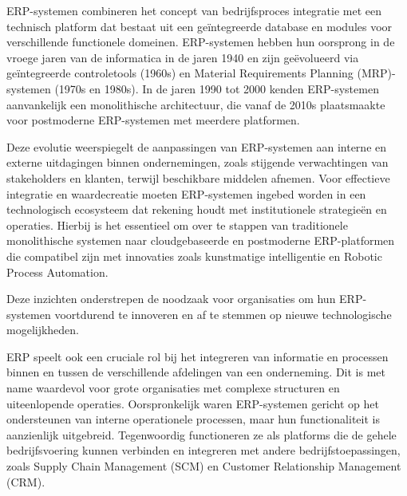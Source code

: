 ERP-systemen combineren het concept van bedrijfsproces integratie met een technisch platform dat bestaat uit een geïntegreerde database en modules voor verschillende functionele domeinen. ERP-systemen hebben hun oorsprong in de vroege jaren van de informatica in de jaren 1940 en zijn geëvolueerd via geïntegreerde controletools (1960s) en Material Requirements Planning (MRP)-systemen (1970s en 1980s). In de jaren 1990 tot 2000 kenden ERP-systemen aanvankelijk een monolithische architectuur, die vanaf de 2010s plaatsmaakte voor postmoderne ERP-systemen met meerdere platformen. \autocite{katuu2020enterprise}

\vspace{\baselineskip}

Deze evolutie weerspiegelt de aanpassingen van ERP-systemen aan interne en externe uitdagingen binnen ondernemingen, zoals stijgende verwachtingen van stakeholders en klanten, terwijl beschikbare middelen afnemen. Voor effectieve integratie en waardecreatie moeten ERP-systemen ingebed worden in een technologisch ecosysteem dat rekening houdt met institutionele strategieën en operaties. Hierbij is het essentieel om over te stappen van traditionele monolithische systemen naar cloudgebaseerde en postmoderne ERP-platformen die compatibel zijn met innovaties zoals kunstmatige intelligentie en Robotic Process Automation. \autocite{katuu2020enterprise}

\vspace{\baselineskip}

Deze inzichten onderstrepen de noodzaak voor organisaties om hun ERP-systemen voortdurend te innoveren en af te stemmen op nieuwe technologische mogelijkheden.

\vspace{\baselineskip}

ERP speelt ook een cruciale rol bij het integreren van informatie en processen binnen en tussen de verschillende afdelingen van een onderneming. Dit is met name waardevol voor grote organisaties met complexe structuren en uiteenlopende operaties. Oorspronkelijk waren ERP-systemen gericht op het ondersteunen van interne operationele processen, maar hun functionaliteit is aanzienlijk uitgebreid. Tegenwoordig functioneren ze als platforms die de gehele bedrijfsvoering kunnen verbinden en integreren met andere bedrijfstoepassingen, zoals Supply Chain Management (SCM) en Customer Relationship Management (CRM). \autocite{sheik2020enterprise}

\vspace{\baselineskip}

